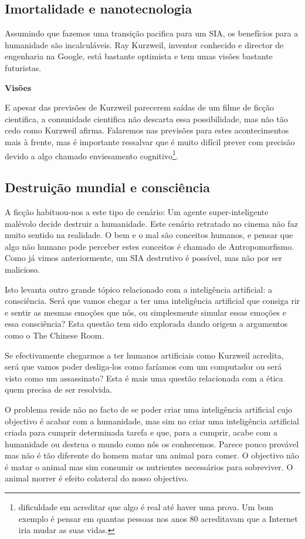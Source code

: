 \documentclass[runningheads,a4paper]{llncs}
\begin{document}
\subsection{Imortalidade e nanotecnologia}

Assumindo que fazemos uma transição pacifica para um SIA, os benefícios para a humanidade são incalculáveis. Ray Kurzweil, inventor conhecido e director de engenharia na Google, está bastante optimista e tem umas visões bastante futuristas.


\textbf{Visões}

E apesar das previsões de Kurzweil parecerem saídas de um filme de ficção cientifica, a comunidade cientifica não descarta essa possibilidade, mas não tão cedo como Kurzweil afirma. Falaremos nas previsões para estes acontecimentos mais à frente, mas é importante ressalvar que é muito difícil prever com precisão devido a algo chamado enviesamento cognitivo\footnote{dificuldade em acreditar que algo é real até haver uma prova. Um bom exemplo é pensar em quantas pessoas nos anos 80 acreditavam que a Internet iria mudar as suas vidas.}.

\subsection{Destruição mundial e consciência}

A ficção habituou-nos a este tipo de cenário: Um agente super-inteligente malévolo decide destruir a humanidade. Este cenário retratado no cinema não faz muito sentido na realidade. O bem e o mal são conceitos humanos, e pensar que algo não humano pode perceber estes conceitos é chamado de Antropomorfismo. Como já vimos anteriormente, um SIA destrutivo é possível, mas não por ser malicioso.

Isto levanta outro grande tópico relacionado com a inteligência artificial: a consciência. Será que vamos chegar a ter uma inteligência artificial que consiga rir e sentir as mesmas emoções que nós, ou simplesmente simular essas emoções e essa consciência? Esta questão tem sido explorada dando origem a argumentos como o The Chinese Room\cite{chineseroom}.

Se efectivamente chegarmos a ter humanos artificiais como Kurzweil acredita, será que vamos poder desliga-los como faríamos com um computador ou será visto como um assassinato? Esta é mais uma questão relacionada com a ética quem precisa de ser resolvida.

O problema reside não no facto de se poder criar uma inteligência artificial cujo objectivo é acabar com a humanidade, mas sim no criar uma inteligência artificial criada para cumprir determinada tarefa e que, para a cumprir, acabe com a humanidade ou destrua o mundo como nós os conhecemos. Parece pouco provável mas não é tão diferente do homem matar um animal para comer. O objectivo não é matar o animal mas sim consumir os nutrientes necessários para sobreviver. O animal morrer é efeito colateral do nosso objectivo.
\end{document}
